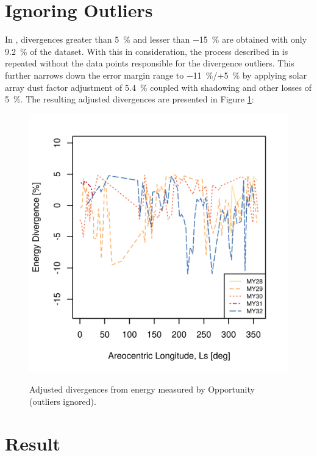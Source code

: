 \clearpage
\section{Ignoring Outliers}
\label{sec:Appendix:NarrowedEnergyPredictionErrorMarginRange:IgnoringOutliers}

In , divergences greater than \SI{5}{\percent} and lesser than \SI{-15}{\percent} are obtained with only \SI{9.2}{\percent} of the dataset. With this in consideration, the process described in  is repeated without the data points responsible for the divergence outliers. This further narrows down the error margin range to \SI{-11}{\percent}/+\SI{5}{\percent} by applying solar array dust factor adjustment of \SI{5.4}{\percent} coupled with shadowing and other losses of \SI{5}{\percent}. The resulting adjusted divergences are presented in Figure \ref{fig:plot:mer-energy-prediction-divergences-adjusted-without-outliers}:

\begin{figure}[h]
  \centering
  \hypersetup{linkcolor=captionTextColor}
  \includegraphics[width=0.5\linewidth]{sections/appendix/energy-error-margin/plots/energy-prediction-divergences-from-my28-to-my32-adjusted-without-outliers.png}\\
  \caption[Adjusted divergences from energy measured by Opportunity (outliers ignored)]
          {Adjusted divergences from energy measured by Opportunity (outliers ignored).}
  \label{fig:plot:mer-energy-prediction-divergences-adjusted-without-outliers}
\end{figure}


\section{Result}
\label{sec:Appendix:NarrowedEnergyPredictionErrorMarginRange:Conclusion}

